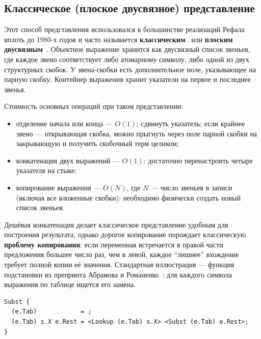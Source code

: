 \documentclass[14pt, russian]{scrartcl}
\newcommand{\enq}[1]{\enquote{#1}}
\begin{document}
\subsection{Классическое (плоское двусвязное) представление}
\label{sec:flat-list}

Этот способ представления использовался в большинстве реализаций Рефала
вплоть до 1980-х годов и часто называется \textbf{классическим}~\cite{skorobogatov_repr}
или \textbf{плоским двусвязным}~\cite{abramov_romanenko_1988}. Объектное
выражение хранится как двусвязный список звеньев, где каждое звено
соответствует либо атомарному символу, либо одной из двух структурных
скобок. У звена-скобки есть дополнительное поле, указывающее на парную
скобку. Контейнер выражения хранит указатели на первое и последнее звенья.

Стоимость основных операций при таком представлении:

\begin{itemize}
  \item отделение начала или конца --- \(O(1)\): сдвинуть указатель; если
        крайнее звено --- открывающая скобка, можно прыгнуть через поле
        парной скобки на закрывающую и получить скобочный терм целиком;
  \item конкатенация двух выражений --- \(O(1)\): достаточно перенастроить
        четыре указателя на стыке;
  \item копирование выражения --- \(O(N)\), где \(N\) --- число
        звеньев в записи (включая все вложенные скобки): необходимо
        физически создать новый список звеньев.
\end{itemize}

Дешёвая конкатенация делает классическое представление удобным для
построения результата, однако дорогое копирование порождает классическую
\textbf{проблему копирования}: если переменная встречается в правой части
предложения большее число раз, чем в левой, каждое \enq{лишнее} вхождение
требует полной копии её значения. Стандартная иллюстрация --- функция
подстановки из препринта Абрамова и Романенко~\cite{abramov_romanenko_1988}:
для каждого символа выражения по таблице ищется его замена.

\begin{lstlisting}[language=Refal,caption={Подстановка по таблице (пример проблемы копирования)},label={lst:subst}]
Subst {
  (e.Tab)            = ;
  (e.Tab) s.X e.Rest = <Lookup (e.Tab) s.X> <Subst (e.Tab) e.Rest>;
}
\end{lstlisting}
\end{document}
